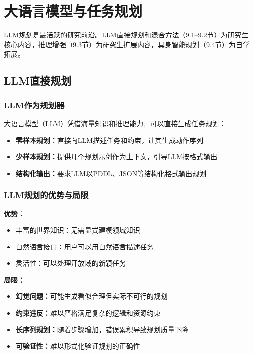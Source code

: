 \chapter{大语言模型与任务规划}

\begin{levelbox}
LLM规划是最活跃的研究前沿。LLM直接规划和混合方法（9.1--9.2节）为研究生核心内容，推理增强（9.3节）为研究生扩展内容，具身智能规划（9.4节）为自学拓展。
\end{levelbox}

\section{LLM直接规划 \grad}

\subsection{LLM作为规划器}

大语言模型（LLM）凭借海量知识和推理能力，可以直接生成任务规划：

\begin{algbox}[title={\textbf{LLM直接规划的基本方式}}]
\begin{itemize}
  \item \textbf{零样本规划：}直接向LLM描述任务和约束，让其生成动作序列
  \item \textbf{少样本规划：}提供几个规划示例作为上下文，引导LLM按格式输出
  \item \textbf{结构化输出：}要求LLM以PDDL、JSON等结构化格式输出规划
\end{itemize}
\end{algbox}

\subsection{LLM规划的优势与局限}

\textbf{优势：}
\begin{itemize}
  \item 丰富的世界知识：无需显式建模领域知识
  \item 自然语言接口：用户可以用自然语言描述任务
  \item 灵活性：可以处理开放域的新颖任务
\end{itemize}

\textbf{局限：}
\begin{itemize}
  \item \textbf{幻觉问题：}可能生成看似合理但实际不可行的规划
  \item \textbf{约束违反：}难以严格满足复杂的逻辑和资源约束
  \item \textbf{长序列规划：}随着步骤增加，错误累积导致规划质量下降
  \item \textbf{可验证性：}难以形式化验证规划的正确性
\end{itemize}

